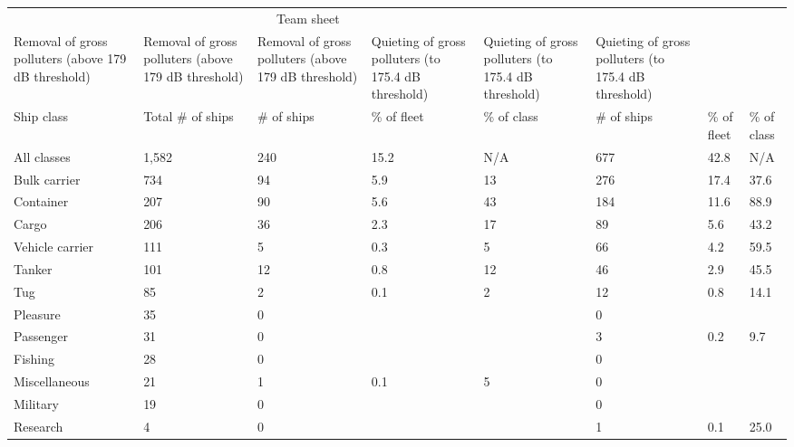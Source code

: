 
\begin{longtable}[]{@{}llllllll@{}}
\toprule
& & \multicolumn{}{|c|}{Team sheet} \\Removal of gross polluters (above 179 dB threshold) & Removal of
gross polluters (above 179 dB threshold) & Removal of gross polluters
(above 179 dB threshold) & Quieting of gross polluters (to 175.4 dB
threshold) & Quieting of gross polluters (to 175.4 dB threshold) &
Quieting of gross polluters (to 175.4 dB threshold)\tabularnewline
\midrule
\endhead
Ship class & Total \# of ships & \# of ships & \% of fleet & \% of class
& \# of ships & \% of fleet & \% of class\tabularnewline
All classes & 1,582 & 240 & 15.2 & N/A & 677 & 42.8 & N/A\tabularnewline
Bulk carrier & 734 & 94 & 5.9 & 13 & 276 & 17.4 & 37.6\tabularnewline
Container & 207 & 90 & 5.6 & 43 & 184 & 11.6 & 88.9\tabularnewline
Cargo & 206 & 36 & 2.3 & 17 & 89 & 5.6 & 43.2\tabularnewline
Vehicle carrier & 111 & 5 & 0.3 & 5 & 66 & 4.2 & 59.5\tabularnewline
Tanker & 101 & 12 & 0.8 & 12 & 46 & 2.9 & 45.5\tabularnewline
Tug & 85 & 2 & 0.1 & 2 & 12 & 0.8 & 14.1\tabularnewline
Pleasure & 35 & 0 & & & 0 & &\tabularnewline
Passenger & 31 & 0 & & & 3 & 0.2 & 9.7\tabularnewline
Fishing & 28 & 0 & & & 0 & &\tabularnewline
Miscellaneous & 21 & 1 & 0.1 & 5 & 0 & &\tabularnewline
Military & 19 & 0 & & & 0 & &\tabularnewline
Research & 4 & 0 & & & 1 & 0.1 & 25.0\tabularnewline
\bottomrule
\end{longtable}